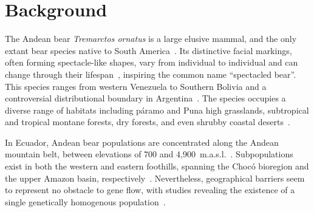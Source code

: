 \documentclass[lineno,referee,pdflatex,sn-vancouver-num]{sn-jnl}%
\theoremstyle{thmstyleone}%
\theoremstyle{thmstyletwo}%
\theoremstyle{thmstylethree}%
\begin{document}

\maketitle

\section{Background}

The Andean bear \textit{Tremarctos ornatus} is a large elusive mammal, and the only extant bear species native to South America~\cite{velez-liendoAndeanBearTremarctos2020}. Its distinctive facial markings, often forming spectacle-like shapes, vary from individual to individual and can change through their lifespan~\cite{garshelisFamilyUrsidaeBears2009,garcia-rangelAndeanBearTremarctos2012,velez-liendoAndeanBearTremarctos2020}, inspiring the common name ``spectacled bear''. This species ranges from western Venezuela to Southern Bolivia and a controversial distributional boundary in Argentina~\cite{velez-liendoAndeanBearTremarctos2020,vela-vargasTremarctosOrnatusCarnivora2021}. The species occupies a diverse range of habitats including páramo and Puna high grasslands, subtropical and tropical montane forests, dry forests, and even shrubby coastal deserts~\cite{garcia-rangelAndeanBearTremarctos2012,velez-liendoAndeanBearTremarctos2020}.

In Ecuador, Andean bear populations are concentrated along the Andean mountain belt, between elevations of 700 and 4,900~m.a.s.l.~\cite{velez-liendoAndeanBearTremarctos2020}. Subpopulations exist in both the western and eastern foothills, spanning the Choc\'{o} bioregion and the upper Amazon basin, respectively~\cite{penterianiBearsWorldEcology2020}. Nevertheless, geographical barriers seem to represent no obstacle to gene flow, with studies revealing the existence of a single genetically homogenous population~\cite{ruiz-garciaGeneticsAndeanBear2020,ruiz-garciaEffectsEcuadorianAndes2025}.
\end{document}
